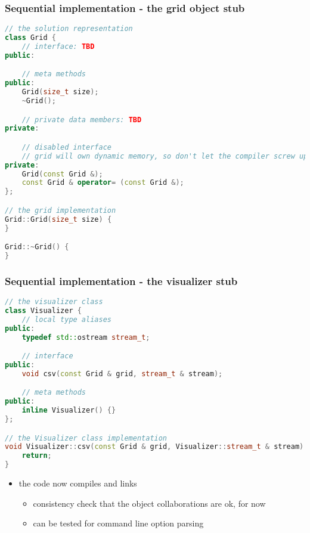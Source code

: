\begin{frame}[fragile]
%
  \frametitle{Sequential implementation - the grid object stub}
%
  \begin{lstlisting}[language=c++,name=seq:frame]
// the solution representation
class Grid {
    // interface: TBD
public:

    // meta methods
public:
    Grid(size_t size);
    ~Grid();

    // private data members: TBD
private:

    // disabled interface
    // grid will own dynamic memory, so don't let the compiler screw up
private:
    Grid(const Grid &);
    const Grid & operator= (const Grid &);
};

// the grid implementation
Grid::Grid(size_t size) {
}

Grid::~Grid() {
}

  \end{lstlisting}
% 
\end{frame}

\begin{frame}[fragile]
%
  \frametitle{Sequential implementation - the visualizer stub}
%
  \begin{lstlisting}[language=c++,name=seq:frame, firstnumber=97]
// the visualizer class
class Visualizer {
    // local type aliases
public:
    typedef std::ostream stream_t;

    // interface
public:
    void csv(const Grid & grid, stream_t & stream);

    // meta methods
public:
    inline Visualizer() {}
};

// the Visualizer class implementation
void Visualizer::csv(const Grid & grid, Visualizer::stream_t & stream) {
    return;
}
  \end{lstlisting}
%

\begin{itemize}
\item the code now compiles and links
  \begin{itemize}
  \item consistency check that the object collaborations are ok, for now
  \item can be tested for command line option parsing
  \end{itemize}
\end{itemize}
% 
\end{frame}

